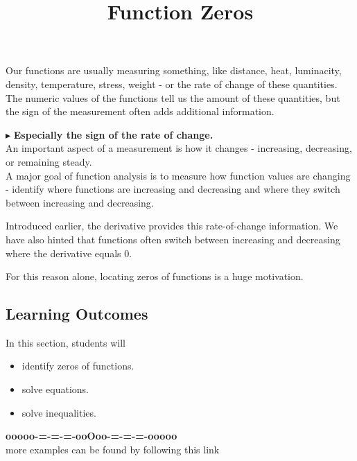 \documentclass{ximera}
\title{Function Zeros}
\begin{document}
\begin{abstract}
\end{abstract}
\maketitle




Our functions are usually measuring something, like distance, heat, luminacity, density, temperature, stress, weight - or the rate of change of these quantities.  The numeric values of the functions tell us the amount of these quantities, but the sign of the measurement often adds additional information. 


$\blacktriangleright$ \textbf{\textcolor{blue!55!black}{Especially the sign of the rate of change.}}   \\



An important aspect of a measurement is how it changes - increasing, decreasing, or remaining steady. \\





A major goal of function analysis is to measure how function values are changing - identify where functions are increasing and decreasing and where they switch between increasing and decreasing.




Introduced earlier, the derivative provides this rate-of-change information.  We have also hinted that functions often switch between increasing and decreasing where the derivative equals $0$.

For this reason alone, locating zeros of functions is a huge motivation.







\subsection*{Learning Outcomes}


\begin{sectionOutcomes}
In this section, students will 

\begin{itemize}
\item identify zeros of functions.
\item solve equations.
\item solve inequalities.
\end{itemize}
\end{sectionOutcomes}

















\begin{center}
\textbf{\textcolor{green!50!black}{ooooo-=-=-=-ooOoo-=-=-=-ooooo}} \\

more examples can be found by following this link\\ 

\end{center}
\end{document}
